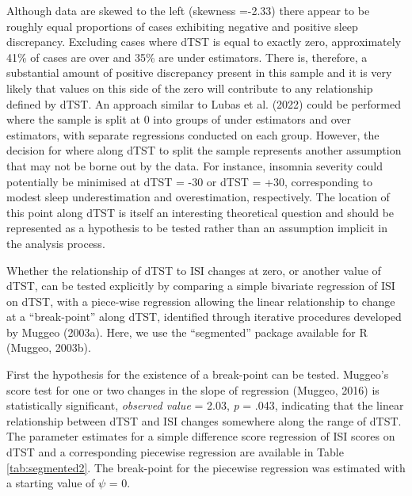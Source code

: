 \documentclass[
]{article}
\begin{document}
Although data are skewed to the left (skewness =-2.33) there appear to be roughly equal proportions of cases exhibiting negative and positive sleep discrepancy. Excluding cases where dTST is equal to exactly zero, approximately 41\% of cases are over and 35\% are under estimators. There is, therefore, a substantial amount of positive discrepancy present in this sample and it is very likely that values on this side of the zero will contribute to any relationship defined by dTST. An approach similar to Lubas et al. (2022) could be performed where the sample is split at 0 into groups of under estimators and over estimators, with separate regressions conducted on each group. However, the decision for where along dTST to split the sample represents another assumption that may not be borne out by the data. For instance, insomnia severity could potentially be minimised at dTST = -30 or dTST = +30, corresponding to modest sleep underestimation and overestimation, respectively. The location of this point along dTST is itself an interesting theoretical question and should be represented as a hypothesis to be tested rather than an assumption implicit in the analysis process.

Whether the relationship of dTST to ISI changes at zero, or another value of dTST, can be tested explicitly by comparing a simple bivariate regression of ISI on dTST, with a piece-wise regression allowing the linear relationship to change at a ``break-point'' along dTST, identified through iterative procedures developed by Muggeo (2003a). Here, we use the ``segmented'' package available for R (Muggeo, 2003b).

First the hypothesis for the existence of a break-point can be tested. Muggeo's score test for one or two changes in the slope of regression (Muggeo, 2016) is statistically significant, \emph{observed value} = 2.03, \emph{p} = .043, indicating that the linear relationship between dTST and ISI changes somewhere along the range of dTST. The parameter estimates for a simple difference score regression of ISI scores on dTST and a corresponding piecewise regression are available in Table \ref{tab:segmented2}. The break-point for the piecewise regression was estimated with a starting value of \(\psi\) = 0.
\end{document}
